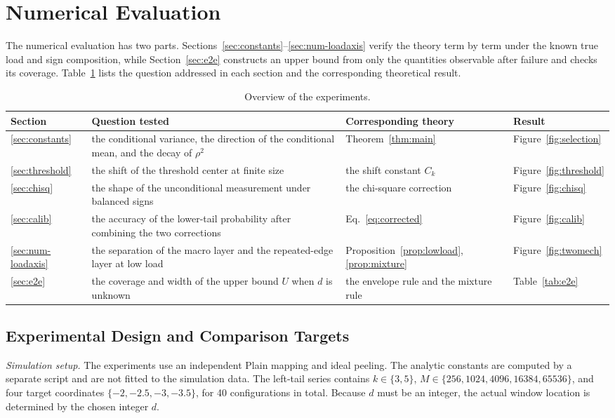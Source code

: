 \section{Numerical Evaluation}\label{sec:numerics}
The numerical evaluation has two parts. Sections~\ref{sec:constants}--\ref{sec:num-loadaxis}
verify the theory term by term under the known true load and sign composition, while
Section~\ref{sec:e2e} constructs an upper bound from only the quantities observable after
failure and checks its coverage. Table~\ref{tab:exp-overview} lists the question addressed in
each section and the corresponding theoretical result.

\begin{table}[!htbp]
\centering
\caption{Overview of the experiments.}
\label{tab:exp-overview}
\small
\begin{tabular}{lp{.5\linewidth}ll}
\toprule
Section & Question tested & Corresponding theory & Result\\
\midrule
\ref{sec:constants} & the conditional variance, the direction of the conditional mean, and the decay of $\rho^2$ & Theorem~\ref{thm:main} & Figure~\ref{fig:selection}\\
\ref{sec:threshold} & the shift of the threshold center at finite size & the shift constant $C_k$ & Figure~\ref{fig:threshold}\\
\ref{sec:chisq} & the shape of the unconditional measurement under balanced signs & the chi-square correction & Figure~\ref{fig:chisq}\\
\ref{sec:calib} & the accuracy of the lower-tail probability after combining the two corrections & Eq.~\eqref{eq:corrected} & Figure~\ref{fig:calib}\\
\ref{sec:num-loadaxis} & the separation of the macro layer and the repeated-edge layer at low load & Proposition~\ref{prop:lowload}, \ref{prop:mixture} & Figure~\ref{fig:twomech}\\
\ref{sec:e2e} & the coverage and width of the upper bound $U$ when $d$ is unknown & the envelope rule and the mixture rule & Table~\ref{tab:e2e}\\
\bottomrule
\end{tabular}
\end{table}

\subsection{Experimental Design and Comparison Targets}\label{sec:exp-design}
\emph{Simulation setup.} The experiments use an independent Plain mapping and ideal peeling.
The analytic constants are computed by a separate script and are not fitted to the simulation
data. The left-tail series contains $k\in\{3,5\}$, $M\in\{256,1024,4096,16384,65536\}$, and
four target coordinates $\{-2,-2.5,-3,-3.5\}$, for 40 configurations in total. Because $d$
must be an integer, the actual window location is determined by the chosen integer $d$.

